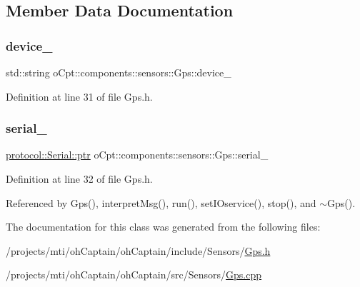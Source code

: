 \subsection{Member Data Documentation}
\hypertarget{classo_cpt_1_1components_1_1sensors_1_1_gps_a6b8c50dca0776870cedabbb527b2144e}{}\label{classo_cpt_1_1components_1_1sensors_1_1_gps_a6b8c50dca0776870cedabbb527b2144e} 
\subsubsection{\texorpdfstring{device\+\_\+}{device\_}}
{\footnotesize\ttfamily std\+::string o\+Cpt\+::components\+::sensors\+::\+Gps\+::device\+\_\+\hspace{0.3cm}{\ttfamily [protected]}}



Definition at line 31 of file Gps.\+h.

\hypertarget{classo_cpt_1_1components_1_1sensors_1_1_gps_a42ea2d37ec01473e92be6ef3cda6de39}{}\label{classo_cpt_1_1components_1_1sensors_1_1_gps_a42ea2d37ec01473e92be6ef3cda6de39} 
\subsubsection{\texorpdfstring{serial\+\_\+}{serial\_}}
{\footnotesize\ttfamily \hyperlink{classo_cpt_1_1protocol_1_1_serial_a4c97c6a2456d649974e07a186f634780}{protocol\+::\+Serial\+::ptr} o\+Cpt\+::components\+::sensors\+::\+Gps\+::serial\+\_\+\hspace{0.3cm}{\ttfamily [protected]}}



Definition at line 32 of file Gps.\+h.



Referenced by Gps(), interpret\+Msg(), run(), set\+I\+Oservice(), stop(), and $\sim$\+Gps().



The documentation for this class was generated from the following files\+:\begin{DoxyCompactItemize}
\item 
/projects/mti/oh\+Captain/oh\+Captain/include/\+Sensors/\hyperlink{_gps_8h}{Gps.\+h}\item 
/projects/mti/oh\+Captain/oh\+Captain/src/\+Sensors/\hyperlink{_gps_8cpp}{Gps.\+cpp}\end{DoxyCompactItemize}
